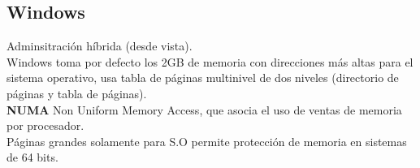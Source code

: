 \subsection{Windows}
Adminsitraci\'{o}n h\'{i}brida (desde vista).\\
Windows toma por defecto los 2GB de memoria con direcciones m\'{a}s altas para el sistema operativo, usa tabla de p\'{a}ginas multinivel de dos niveles (directorio de p\'{a}ginas y tabla de p\'{a}ginas).\\
\textbf{NUMA} Non Uniform Memory Access, que asocia el uso de ventas de memoria por procesador.\\
P\'{a}ginas grandes solamente para S.O permite protecci\'{o}n de memoria en sistemas de 64 bits.\\
